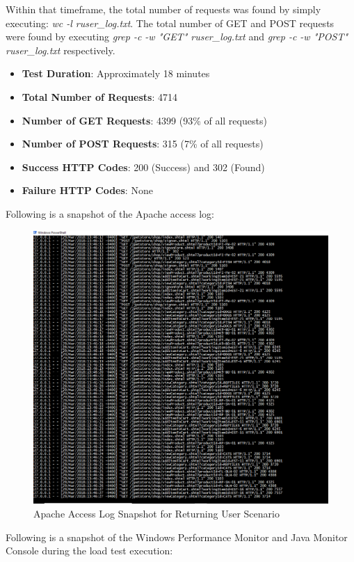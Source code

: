 \documentclass[fontsize=12pt,paper=letter,twoside]{scrartcl}
\begin{document}
\bigskip
\noindent Within that timeframe, the total number of requests was found by simply executing: \emph{wc -l ruser\_log.txt}. The total number of GET and POST requests were found by executing \emph{grep -c -w "GET" ruser\_log.txt} and \emph{grep -c -w "POST" ruser\_log.txt} respectively.

\begin{itemize}
\item \textbf{Test Duration}: Approximately 18 minutes
\item \textbf{Total Number of Requests}: 4714
\item \textbf{Number of GET Requests}: 4399 (93\% of all requests)
\item \textbf{Number of POST Requests}: 315 (7\% of all requests)
\item \textbf{Success HTTP Codes}: 200 (Success) and 302 (Found)
\item \textbf{Failure HTTP Codes}: None
\end{itemize}

\bigskip
\noindent Following is a snapshot of the Apache access log:
\begin{figure}[!htb]
\begin{center}
\includegraphics[width=.6\textwidth]{../../load-test/test-plans/returning-user/access-log.png}
\end{center}
\caption{Apache Access Log Snapshot for Returning User Scenario}
\label{fig:ruser:access_log}
\end{figure}

\clearpage
\bigskip
\noindent Following is a snapshot of the Windows Performance Monitor and Java Monitor Console during the load test execution:
\end{document}
